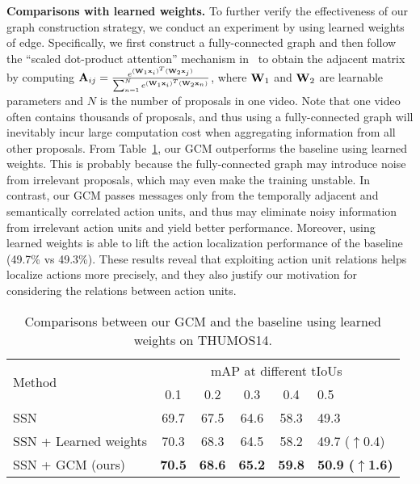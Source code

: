 \documentclass[10pt,journal,compsoc]{IEEEtran}
\begin{document}
	\noindent \textbf{Comparisons with learned weights.} To further verify the effectiveness of our graph construction strategy, we conduct an experiment by using learned weights of edge. Specifically, we first construct a fully-connected graph and then follow the ``scaled dot-product attention'' mechanism in~\cite{vaswani2017attention} to obtain the adjacent matrix by computing
        	${\bf A}_{ij} = \frac{e^{({\bf W}_1{\bf x}_i)^T  ({\bf W}_2{\bf x}_j)}}{\sum_{n=1}^{N} e^{({\bf W}_1{\bf x}_i)^T  ({\bf W}_2{\bf x}_n)}}$,
	where ${\bf W}_1$ and ${\bf W}_2$ are learnable parameters and $N$ is the number of proposals in one video. 
	Note that one video often contains thousands of proposals, and thus using a fully-connected graph will inevitably incur large computation cost when aggregating information from all other proposals. From Table~\ref{Tab:self-att}, our GCM outperforms the baseline using learned weights. This is probably because the fully-connected graph may introduce noise from irrelevant proposals, which may even make the training unstable. In contrast, our GCM passes messages only from the temporally adjacent and semantically correlated action units, and thus may eliminate noisy information from irrelevant action units and yield better performance. Moreover, using learned weights is able to lift the action localization performance of the baseline (49.7\% vs 49.3\%). These results reveal that exploiting action unit relations helps localize actions more precisely, and they also justify our motivation for considering the relations between action units.
	
	
	
	    
	    \begin{table}[!t]
	    
		\centering
		\caption{Comparisons between our GCM and the baseline using learned weights on THUMOS14.}
		\begin{tabular}{l|ccccl}
			\hline
			\multirow{2}{*}{Method}   & \multicolumn{5}{c}{mAP at different tIoUs} \\  \cline{2-6}
			            & 0.1    & 0.2  & 0.3 & 0.4  &0.5       \\ \hline
			SSN~\cite{zhao2017temporal}    & 69.7 & 67.5 & 64.6 & 58.3 & 49.3       \\ 
			SSN + Learned weights  & 70.3 & 68.3 & 64.5 & 58.2 & 49.7 ($\uparrow$0.4)       \\
			SSN + GCM (ours) & \textbf{70.5} & \textbf{68.6} & \textbf{65.2} & \textbf{59.8}  & \textbf{50.9 ($\uparrow$1.6)}        \\ \hline
		\end{tabular}
		\label{Tab:self-att}
	\end{table}
	
\end{document}
